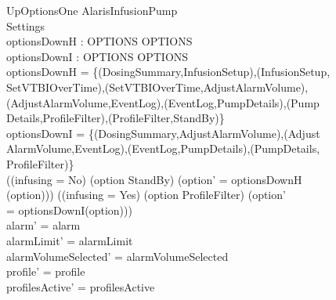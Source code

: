 \begin{schema}{UpOptionsOne}
	\Delta AlarisInfusionPump\\
	 Settings\\
	optionsDownH : OPTIONS \rel OPTIONS\\
	optionsDownI : OPTIONS \rel OPTIONS\\
	\where
	optionsDownH = \{(DosingSummary,InfusionSetup),(InfusionSetup,\\
	SetVTBIOverTime),(SetVTBIOverTime,AdjustAlarmVolume),\\
	(AdjustAlarmVolume,EventLog),(EventLog,PumpDetails),(Pump\\
	Details,ProfileFilter),(ProfileFilter,StandBy)\}\\
	optionsDownI = \{(DosingSummary,AdjustAlarmVolume),(Adjust\\
	AlarmVolume,EventLog),(EventLog,PumpDetails),(PumpDetails,\\
	ProfileFilter)\}\\
	((infusing = No) \land (option \neq StandBy) \land (option' = optionsDownH\\
	(option))) \lor ((infusing = Yes) \land (option \neq ProfileFilter) \land (option' \\
	= optionsDownI(option)))\\
	alarm' = alarm\\
	alarmLimit' = alarmLimit\\
	alarmVolumeSelected' = alarmVolumeSelected\\
	profile' = profile\\
	profilesActive' = profilesActive\\  
	  

\end{schema}
